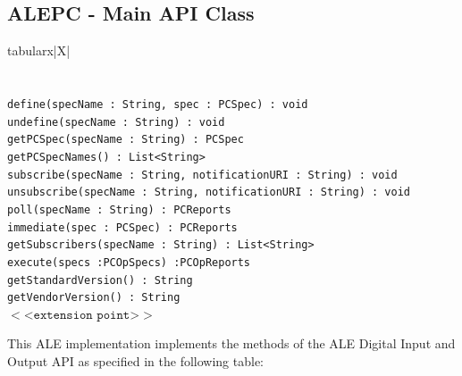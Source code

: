 \documentclass[11pt,a4paper,oneside]{article}
\newenvironment{bbox}%
{\begin{table}[h!]\begin{threeparttable}}%
{\end{threeparttable}\end{table}\FloatBarrier}
\newenvironment{bbox}
{\ifvmode\IgnorePar\fi \EndP\Tg<div class='bbox'>}{\Tg</div>\IgnoreIndent}
\begin{document}
\subsection{ALEPC - Main API Class}
\label{subsec:ALEPCM}

\begin{bbox}
\begin{edtable}{tabularx}{\linewidth}{|X|}
\hline 
{}
\\
\\
\texttt{\textendash \textendash \textendash}\\
\texttt{define(specName : String, spec : PCSpec) : void}\\
\texttt{undefine(specName : String) : void}\\
\texttt{getPCSpec(specName : String) : PCSpec}\\
\texttt{getPCSpecNames() : List<String>}\\
\texttt{subscribe(specName : String, notificationURI : String) : void}\\
\texttt{unsubscribe(specName : String, notificationURI : String) : void}\\
\texttt{poll(specName : String) : PCReports}\\
\texttt{immediate(spec : PCSpec) : PCReports}\\
\texttt{getSubscribers(specName : String) : List<String>}\\
\texttt{execute(specs :PCOpSpecs) :PCOpReports}\\
\texttt{getStandardVersion() : String}\\
\texttt{getVendorVersion() : String}\\
$<$<$\texttt{extension point}$>$>$\\
\hline
\end{edtable}
\end{bbox}

This ALE implementation implements the methods of the ALE Digital Input and Output API as specified in the following table:
\end{document}
